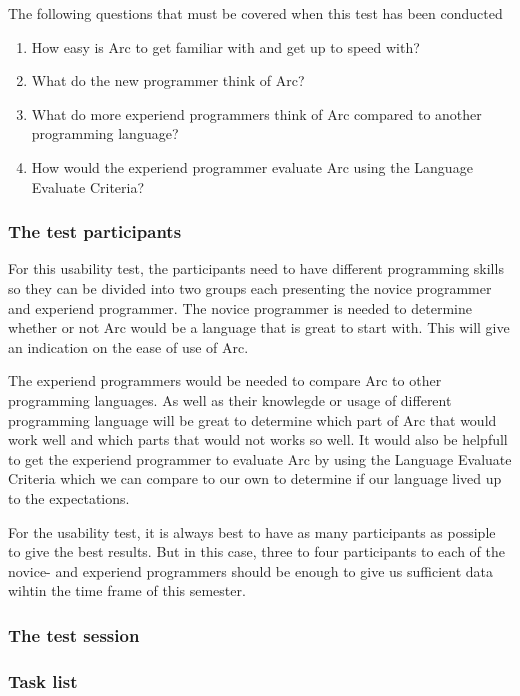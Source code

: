 The following questions that must be covered when this test has been conducted
\begin{enumerate}
    \item How easy is Arc to get familiar with and get up to speed with?
    \item What do the new programmer think of Arc?
    \item What do more experiend programmers think of Arc compared to another programming language?
    \item How would the experiend programmer evaluate Arc using the Language Evaluate Criteria?
\end{enumerate}

\subsubsection{The test participants}\label{subsubsec:theTestParticipants}
For this usability test, the participants need to have different programming skills so they can be divided into two groups each presenting the novice programmer and experiend programmer. The novice programmer is needed to determine whether or not Arc would be a language that is great to start with. This will give an indication on the ease of use of Arc.

The experiend programmers would be needed to compare Arc to other programming languages. As well as their knowlegde or usage of different programming language will be great to determine which part of Arc that would work well and which parts that would not works so well. It would also be helpfull to get the experiend programmer to evaluate Arc by using the Language Evaluate Criteria which we can compare to our own to determine if our language lived up to the expectations.

For the usability test, it is always best to have as many participants as possiple to give the best results. But in this case, three to four participants to each of the novice- and experiend programmers should be enough to give us sufficient data wihtin the time frame of this semester.

\subsubsection{The test session}\label{subsubsec:theTestSession}



\subsubsection{Task list}\label{subsubsec:taskList}

